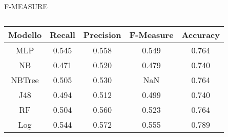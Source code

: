 F-MEASURE

\begin{table}[H]
\tabcolsep=0.10cm
\small
\begin{tabular}{c c c c c}
     Modello & Recall & Precision & F-Measure & Accuracy  \\
     \hline
     MLP & 0.545 & 0.558 & 0.549 & 0.764 \\
     NB & 0.471 & 0.520 & 0.479 & 0.740 \\
     NBTree & 0.505 & 0.530 & NaN & 0.764 \\
     J48 & 0.494 & 0.512 & 0.499 & 0.740 \\
     RF & 0.504 & 0.560 & 0.523 & 0.764 \\
     Log & 0.544 & 0.572 & 0.555 & 0.789 \\
     \hline
\end{tabular}
\caption{}
\end{table}